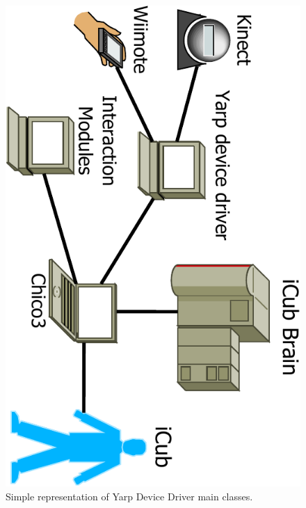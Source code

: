 	\begin{figure}[htb]
	\begin{center}
	\includegraphics[scale=0.30,page=4,angle=90]{icubSimpleNetworkDiagram-crop.pdf}
	\end{center}
	\caption[Simple representation of Yarp Device Driver main classes]{Simple representation of Yarp Device Driver main classes.} 
	\label{fig:YarpDeviceDriverSimpleRepresentation}
	\end{figure}
	
